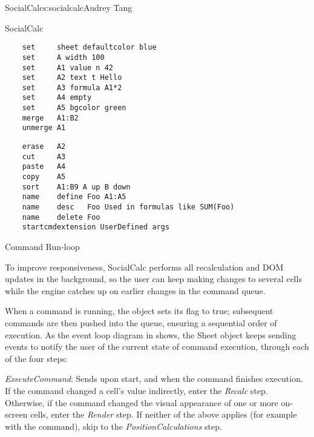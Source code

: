 \begin{aosachapter}{SocialCalc}{s:socialcalc}{Audrey Tang}
\begin{aosasect1}{SocialCalc}
\begin{table}[ht]
\begin{minipage}[b]{0.4\linewidth}\centering

\begin{verbatim}
    set     sheet defaultcolor blue
    set     A width 100
    set     A1 value n 42
    set     A2 text t Hello
    set     A3 formula A1*2
    set     A4 empty
    set     A5 bgcolor green
    merge   A1:B2
    unmerge A1
\end{verbatim}

\end{minipage}
\hspace{0.5cm}
\begin{minipage}[b]{0.6\linewidth}
\centering

\begin{verbatim}
    erase   A2
    cut     A3
    paste   A4
    copy    A5
    sort    A1:B9 A up B down
    name    define Foo A1:A5
    name    desc   Foo Used in formulas like SUM(Foo)
    name    delete Foo
    startcmdextension UserDefined args
\end{verbatim}

\end{minipage}
\caption{SocialCalc Commands}
\label{tbl.soc.commands}
\end{table}

\end{aosasect1}

\begin{aosasect1}{Command Run-loop}

To improve responsiveness, SocialCalc performs all recalculation and
DOM updates in the background, so the user can keep making changes to
several cells while the engine catches up on earlier changes in the
command queue.


When a command is running, the  object sets its
 flag to true; subsequent commands are then pushed into the
 queue, ensuring a sequential order of
execution.  As the event loop diagram in 
shows, the Sheet object keeps sending  events to
notify the user of the current state of command execution, through
each of the four steps:

\begin{aosadescription}

  \item{\emph{ExecuteCommand}}: Sends  upon start, and
    when the command finishes execution.  If the command
   changed a cell's value indirectly, enter the \emph{Recalc} step.
   Otherwise, if the command changed the visual appearance of one or
   more on-screen cells, enter the \emph{Render} step.  If neither of
   the above applies (for example with the  command), skip
   to the \emph{PositionCalculations} step.


\end{aosadescription}
\end{aosasect1}
\end{aosachapter}

